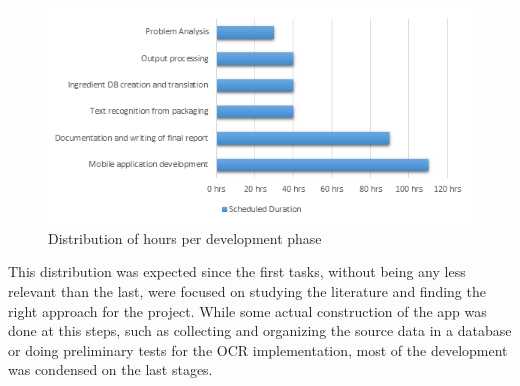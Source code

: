 \begin{figure}[h]
  \centering
  \includegraphics[width=\textwidth]{Figures/ganttbars.png}
  \caption{%
    Distribution of hours per development phase
  }
  \label{fig:ganttbars}
\end{figure}

This distribution was expected since the first tasks, without being any less relevant than the last, were focused on studying the literature and finding the right approach for the project. While some actual construction of the app was done at this steps, such as collecting and organizing the source data in a database or doing preliminary tests for the OCR implementation, most of the development was condensed on the last stages.